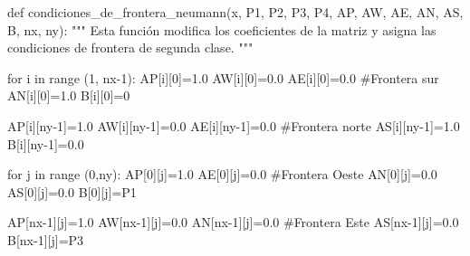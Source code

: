 \documentclass[
  letterpaper,
  DIV=11,
  numbers=noendperiod]{scrreprt}
\newenvironment{Shaded}{\begin{snugshade}}{\end{snugshade}}
\newcommand{\BuiltInTok}[1]{\textcolor[rgb]{0.00,0.23,0.31}{#1}}
\newcommand{\CommentTok}[1]{\textcolor[rgb]{0.37,0.37,0.37}{#1}}
\newcommand{\ControlFlowTok}[1]{\textcolor[rgb]{0.00,0.23,0.31}{#1}}
\newcommand{\DecValTok}[1]{\textcolor[rgb]{0.68,0.00,0.00}{#1}}
\newcommand{\FloatTok}[1]{\textcolor[rgb]{0.68,0.00,0.00}{#1}}
\newcommand{\KeywordTok}[1]{\textcolor[rgb]{0.00,0.23,0.31}{#1}}
\newcommand{\NormalTok}[1]{\textcolor[rgb]{0.00,0.23,0.31}{#1}}
\newcommand{\OperatorTok}[1]{\textcolor[rgb]{0.37,0.37,0.37}{#1}}
\begin{document}
\begin{Shaded}
\begin{Highlighting}[]
\KeywordTok{def}\NormalTok{ condiciones\_de\_frontera\_neumann(x, P1, P2, P3, P4, AP, AW, AE, AN, AS, B, nx, ny):}
    \CommentTok{"""}
\CommentTok{    Esta función modifica los coeficientes de la matriz y asigna las condiciones de frontera de segunda clase. }
\CommentTok{    """}
    
    \ControlFlowTok{for}\NormalTok{ i }\KeywordTok{in} \BuiltInTok{range}\NormalTok{ (}\DecValTok{1}\NormalTok{, nx}\OperatorTok{{-}}\DecValTok{1}\NormalTok{):}
\NormalTok{        AP[i][}\DecValTok{0}\NormalTok{]}\OperatorTok{=}\FloatTok{1.0}
\NormalTok{        AW[i][}\DecValTok{0}\NormalTok{]}\OperatorTok{=}\FloatTok{0.0}    
\NormalTok{        AE[i][}\DecValTok{0}\NormalTok{]}\OperatorTok{=}\FloatTok{0.0}      \CommentTok{\#Frontera sur}
\NormalTok{        AN[i][}\DecValTok{0}\NormalTok{]}\OperatorTok{=}\FloatTok{1.0}
\NormalTok{        B[i][}\DecValTok{0}\NormalTok{]}\OperatorTok{=}\DecValTok{0}
        
\NormalTok{        AP[i][ny}\OperatorTok{{-}}\DecValTok{1}\NormalTok{]}\OperatorTok{=}\FloatTok{1.0}
\NormalTok{        AW[i][ny}\OperatorTok{{-}}\DecValTok{1}\NormalTok{]}\OperatorTok{=}\FloatTok{0.0}    
\NormalTok{        AE[i][ny}\OperatorTok{{-}}\DecValTok{1}\NormalTok{]}\OperatorTok{=}\FloatTok{0.0}    \CommentTok{\#Frontera norte}
\NormalTok{        AS[i][ny}\OperatorTok{{-}}\DecValTok{1}\NormalTok{]}\OperatorTok{=}\FloatTok{1.0}
\NormalTok{        B[i][ny}\OperatorTok{{-}}\DecValTok{1}\NormalTok{]}\OperatorTok{=}\FloatTok{0.0}
    
    \ControlFlowTok{for}\NormalTok{ j }\KeywordTok{in} \BuiltInTok{range}\NormalTok{ (}\DecValTok{0}\NormalTok{,ny):}
\NormalTok{        AP[}\DecValTok{0}\NormalTok{][j]}\OperatorTok{=}\FloatTok{1.0}
\NormalTok{        AE[}\DecValTok{0}\NormalTok{][j]}\OperatorTok{=}\FloatTok{0.0}      \CommentTok{\#Frontera Oeste}
\NormalTok{        AN[}\DecValTok{0}\NormalTok{][j]}\OperatorTok{=}\FloatTok{0.0}
\NormalTok{        AS[}\DecValTok{0}\NormalTok{][j]}\OperatorTok{=}\FloatTok{0.0}
\NormalTok{        B[}\DecValTok{0}\NormalTok{][j]}\OperatorTok{=}\NormalTok{P1}
        
\NormalTok{        AP[nx}\OperatorTok{{-}}\DecValTok{1}\NormalTok{][j]}\OperatorTok{=}\FloatTok{1.0}
\NormalTok{        AW[nx}\OperatorTok{{-}}\DecValTok{1}\NormalTok{][j]}\OperatorTok{=}\FloatTok{0.0}
\NormalTok{        AN[nx}\OperatorTok{{-}}\DecValTok{1}\NormalTok{][j]}\OperatorTok{=}\FloatTok{0.0}   \CommentTok{\#Frontera Este}
\NormalTok{        AS[nx}\OperatorTok{{-}}\DecValTok{1}\NormalTok{][j]}\OperatorTok{=}\FloatTok{0.0}
\NormalTok{        B[nx}\OperatorTok{{-}}\DecValTok{1}\NormalTok{][j]}\OperatorTok{=}\NormalTok{P3}
\end{Highlighting}
\end{Shaded}
\end{document}
